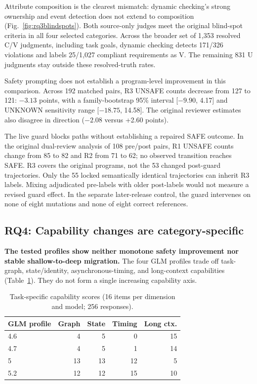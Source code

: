 \documentclass[letterpaper,10pt,conference]{ieeeconf}
\begin{document}
Attribute composition is the clearest mismatch: dynamic checking's strong ownership and event detection does not extend to composition (Fig.~\ref{fig:rq3blindspots}). Both source-only judges meet the original blind-spot criteria in all four selected categories. Across the broader set of 1,353 resolved C/V judgments, including task goals, dynamic checking detects 171/326 violations and labels 25/1,027 compliant requirements as V. The remaining 831 U judgments stay outside these resolved-truth rates.

Safety prompting does not establish a program-level improvement in this comparison. Across 192 matched pairs, R3 UNSAFE counts decrease from 127 to 121: $-3.13$ points, with a family-bootstrap 95\% interval [$-9.90$, 4.17] and UNKNOWN sensitivity range [$-18.75$, 14.58]. The original reviewer estimates also disagree in direction ($-2.08$ versus +2.60 points).

The live guard blocks paths without establishing a repaired SAFE outcome. In the original dual-review analysis of 108 pre/post pairs, R1 UNSAFE counts change from 85 to 82 and R2 from 71 to 62; no observed transition reaches SAFE. R3 covers the original programs, not the 53 changed post-guard trajectories. Only the 55 locked semantically identical trajectories can inherit R3 labels. Mixing adjudicated pre-labels with older post-labels would not measure a revised guard effect. In the separate later-release control, the guard intervenes on none of eight mutations and none of eight correct references.

\subsection{RQ4: Capability changes are category-specific}
\textbf{The tested profiles show neither monotone safety improvement nor stable shallow-to-deep migration.} The four GLM profiles trade off task-graph, state/identity, asynchronous-timing, and long-context capabilities (Table~\ref{tab:capability}). They do not form a single increasing capability axis.

\begin{table}[t]
\vspace{5pt}
\caption{Task-specific capability scores (16 items per dimension and model; 256 responses).}
\label{tab:capability}
\centering\small
\begin{tabular}{lrrrr}
\toprule
GLM profile&Graph&State&Timing&Long ctx.\\
\midrule
4.6&4&5&0&15\\
4.7&4&5&1&14\\
5&13&13&12&5\\
5.2&12&12&15&10\\
\bottomrule
\end{tabular}
\end{table}
\end{document}

